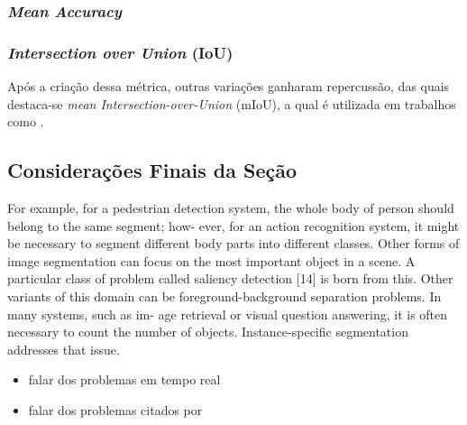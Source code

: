 \subsubsection{\textit{Mean Accuracy}}
\subsubsection{\textit{Intersection over Union} (IoU)}
\label{semantic:IoU}

Após a criação dessa métrica, outras variações ganharam repercussão, das quais destaca-se \textit{mean Intersection-over-Union} (mIoU), a qual é utilizada em trabalhos como \cite{Mohan2020}.


\subsection{Considerações Finais da Seção}
For example, for a pedestrian detection system, the whole body of person should belong to the same segment; how- ever, for an action recognition system, it might be necessary to segment different body parts into different classes. Other forms of image segmentation can focus on the most important object in a scene. A particular class of problem called saliency detection [14] is born from this. Other variants of this domain can be foreground-background separation problems. In many systems, such as im- age retrieval or visual question answering, it is often necessary to count the number of objects. Instance-specific segmentation addresses that issue.

\begin{itemize}
    \item falar dos problemas em tempo real \cite{Yu2018}
    \item falar dos problemas citados por \cite{Kirillov2019a}
\end{itemize}
